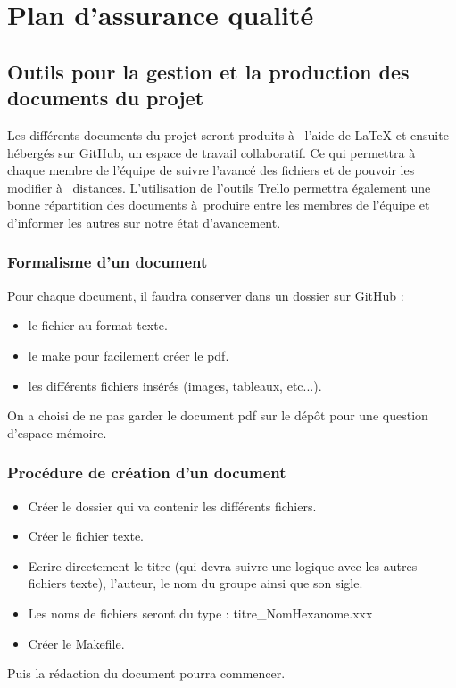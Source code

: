 \chapter{Plan d'assurance qualité}

\section{Outils pour la gestion et la production des documents du projet}

    Les différents documents du projet seront produits à  l'aide de LaTeX et ensuite hébergés sur GitHub, un espace de travail collaboratif. Ce qui permettra à  chaque membre de l'équipe de suivre l'avancé des fichiers et de pouvoir les modifier à  distances. 
    L'utilisation de l'outils Trello permettra également une bonne répartition des documents à produire entre les membres de l'équipe et d'informer les autres sur notre état d'avancement.

\subsection{Formalisme d'un document}

Pour chaque document, il faudra conserver dans un dossier sur GitHub :
\begin{itemize}
    \item le fichier au format texte.
    \item le make pour facilement créer le pdf.
    \item les différents fichiers insérés (images, tableaux, etc...).
\end{itemize}
On a choisi de ne pas garder le document pdf sur le dépôt pour une question d'espace mémoire.
\subsection{Procédure de création d'un document}

\begin{itemize}
    \item Créer le dossier qui va contenir les différents fichiers.
    \item Créer le fichier texte.
    \item Ecrire directement le titre (qui devra suivre une logique avec les autres fichiers texte), l'auteur, le nom du groupe ainsi que son sigle.
    \item Les noms de fichiers seront du type : titre\_NomHexanome.xxx
   \item Créer le Makefile.
\end{itemize}
Puis la rédaction du document pourra commencer.

